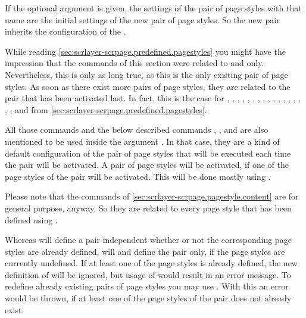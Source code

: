 If the optional argument  is given, the settings of the
pair of page styles with that name are the initial settings of the new pair of
page styles. So the new pair inherits the configuration of the .

While reading \autoref{sec:scrlayer-scrpage.predefined.pagestyles} you might
have the impression that the commands of this section were related to
 and  only. Nevertheless,
this is only as long true, as this is the only existing pair of page
styles. As soon as there exist more pairs of page styles, they are related to
the pair that has been activated last. In fact, this is the case for , , , ,
, , , ,
, , , , ,
, , , , and 
from \autoref{sec:scrlayer-scrpage.predefined.pagestyles}.

All those commands and the below described commands , , and
 are also mentioned to be used inside the
argument . In that case, they are a kind of default
configuration of the pair of page styles that will be executed each time the
pair will be activated. A pair of page styles will be activated, if one of the
page styles of the pair will be activated. This will be done mostly using
.

Please note that the commands of
\autoref{sec:scrlayer-scrpage.pagestyle.content} are for general purpose,
anyway. So they are related to every page style that has been defined using
.

Whereas  will define a pair independent whether or
not the corresponding page styles are already defined, will
 and  define the pair
only, if the page styles are currently undefined. If at least one of the page
styles is already defined, the new definition of
 will be ignored, but usage of
 would result in an error message. To redefine
already existing pairs of page styles you may use
. With this an error would be thrown, if at least
one of the page styles of the pair does not already exist.%
%
%
%
%

